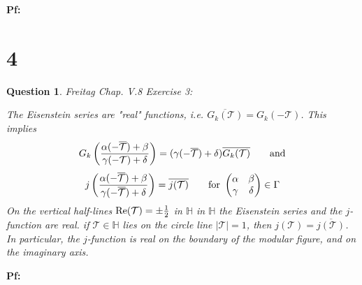 \documentclass{article}
\newtheorem{question}{Question}
\begin{document}
\textbf{Pf:}

\break

\section*{4}
\begin{myBox}[]{}
    \begin{question}
        Freitag Chap. V.8 Exercise 3:

        The Eisenstein series are "real" functions, i.e. $\overline{G_k(\mathcal{T})}=G_k(-\mathcal{T})$. This implies 
        $$G_k\left(\frac{\alpha(-\overline{\mathcal{T}})+\beta}{\gamma(-\mathcal{T})+\delta}\right) = (\gamma(-\overline{\mathcal{T}})+\delta)\overline{G_k(\mathcal{T})} \quad \quad \textmd{and}$$
        $$j\left(\frac{\alpha(-\overline{\mathcal{T}})+\beta}{\gamma(-\overline{\mathcal{T}})+\delta}\right)=\overline{j(\mathcal{T})}\quad\quad \textmd{for } \begin{pmatrix}\alpha&\beta\\\gamma&\delta\end{pmatrix}\in \Gamma$$
        On the vertical half-lines $\textmd{Re}(\mathcal{T})=\pm\frac{1}{2}$ in $\mathbb{H}$ in $\mathbb{H}$ the Eisenstein series and the $j$-function are real. if $\mathcal{T}\in\mathbb{H}$ lies on the circle line $|\mathcal{T}|=1$, then $j(\mathcal{T})=\overline{j(\mathcal{T})}$. In particular, the $j$-function is real on the boundary of the modular figure, and on the imaginary axis.
    \end{question}
\end{myBox}

\textbf{Pf:}
\end{document}
